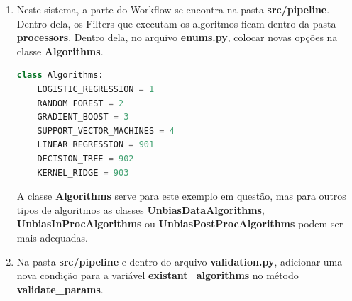 \documentclass[Portugues,Final]{ic-tese-v3}
\begin{document}
\begin{enumerate}
\item Neste sistema, a parte do Workflow se encontra na pasta \textbf{src/pipeline}. Dentro dela, os Filters que executam os algoritmos ficam dentro da pasta \textbf{processors}. Dentro dela, no arquivo \textbf{enums.py}, colocar novas opções na classe \textbf{Algorithms}.

\begin{lstlisting}[language=Python, label=cod:EnumAlgorithmOptions]
class Algorithms:
    LOGISTIC_REGRESSION = 1
    RANDOM_FOREST = 2
    GRADIENT_BOOST = 3
    SUPPORT_VECTOR_MACHINES = 4
    LINEAR_REGRESSION = 901
    DECISION_TREE = 902
    KERNEL_RIDGE = 903
\end{lstlisting}

A classe \textbf{Algorithms} serve para este exemplo em questão, mas para outros tipos de algoritmos as classes \textbf{UnbiasDataAlgorithms}, \textbf{UnbiasInProcAlgorithms} ou \textbf{UnbiasPostProcAlgorithms} podem ser mais adequadas.

\item Na pasta \textbf{src/pipeline} e dentro do arquivo \textbf{validation.py}, adicionar uma nova condição para a variável \textbf{existant\_algorithms} no método \textbf{validate\_params}.


\end{enumerate}
\end{document}
